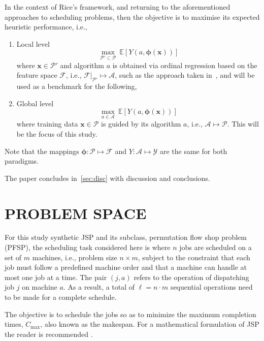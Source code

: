 \documentclass[a4paper,twoside]{article}
\renewcommand{\vec}[1]{\mathbf{#1}}
\newcommand{\vphi}{{\boldsymbol{\phi}}}
\begin{document}
In the context of Rice's framework, and returning to the aforementioned approaches to scheduling problems, then the objective is to maximise its expected heuristic performance, i.e.,
\begin{enumerate} 
\item Local level 
\begin{equation}
\max_{\mathcal{P}'\subset\mathcal{P}}~\mathbb{E}\left[Y\left(a,\vphi(\vec{x})\right)\right]
\end{equation}
where $\vec{x}\in\mathcal{P}'$ and algorithm $a$ is obtained via ordinal regression based on the feature space $\mathcal{F}$, i.e., $\mathcal{F}|_{\mathcal{P}'}\mapsto\mathcal{A}$, such as the approach taken in~\cite{InRu11a}, and  will be used as a benchmark for the following,  
\item  Global level
\begin{equation}
\max_{a\in\mathcal{A}}~\mathbb{E}\left[Y\left(a,\vphi(\vec{x})\right)\right]
\end{equation}
where training data $\vec{x}\in\mathcal{P}$ is guided by its algorithm $a$, i.e., $\mathcal{A}\mapsto\mathcal{P}$. This will be the focus of this study.
\end{enumerate}
Note that the mappings $\vphi:\mathcal{P}\mapsto\mathcal{F}$ and $Y:\mathcal{A}\mapsto\mathcal{Y}$ are the same for both paradigms.

The paper concludes in~\cref{sec:disc} with discussion and conclusions.

\section{\uppercase{Problem space}}\label{sec:data}
For this study synthetic JSP and its subclass, permutation flow shop problem (PFSP), the scheduling task considered here is where $n$ jobs are scheduled on a set of $m$ machines, i.e., problem size $n\times m$, subject to the constraint that each job must follow a predefined machine order and that a machine can handle at most one job at a time. The pair $(j,a)$ refers to the operation of dispatching job $j$ on machine $a$. As a result, a total of $\ell = n\cdot m$ sequential operations need to be made for a complete schedule.

The objective is to schedule the jobs so as to minimize the maximum completion times, $C_{\max}$, also known as the makespan.  For a mathematical formulation of JSP the reader is recommended \cite{InRu11a}. 
\end{document}
